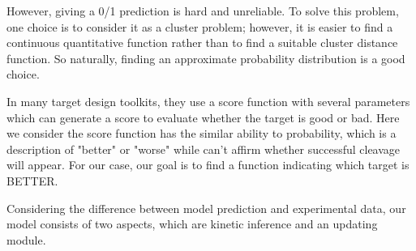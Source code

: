 However, giving a 0/1 prediction is hard and unreliable. To solve this problem, one choice is to consider it as a cluster problem; however, it is easier to find a continuous quantitative function rather than to find a suitable cluster distance function. So naturally, finding an approximate probability distribution is a good choice. 
	
In many target design toolkits, they use a score function with several parameters which can generate a score to evaluate whether the target is good or bad. Here we consider the score function has the similar ability to probability, which is a description of "better" or "worse" while can’t affirm whether successful cleavage will appear. For our case, our goal is to find a function indicating which target is BETTER.
	
Considering the difference between model prediction and experimental data, our model consists of two aspects, which are kinetic inference and an updating module.